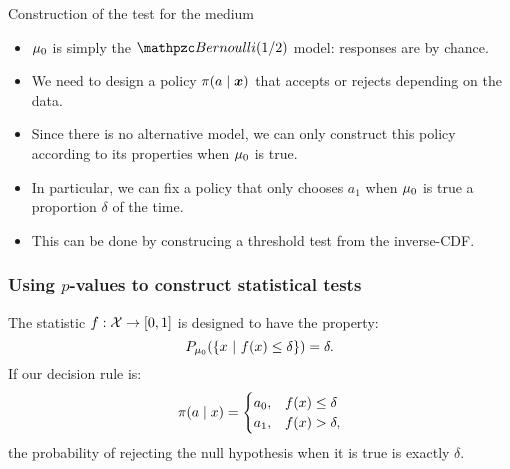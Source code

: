 {\begin{frame}
  \begin{example}{Construction of the test for the medium}
    \begin{itemize}
    \item<2-> $\mu_0$ is simply the $\Bernoulli(1/2)$ model: responses are by chance.
    \item<3-> We need to design a policy $\pol(a \mid \bx)$ that accepts or rejects depending on the data.
    \item<4-> Since there is no alternative model, we can only construct this policy according to its properties when $\mu_0$ is true.
    \item<5-> In particular, we can fix a policy that only chooses $a_1$ when $\mu_0$ is true a proportion $\delta$ of the time.
    \item<6-> This can be done by construcing a threshold test from the inverse-CDF.
    \end{itemize}
  \end{example}
\end{frame}
\begin{frame}
  \frametitle{Using $p$-values to construct statistical tests}
  \begin{definition}
    The statistic $f : {\mathcal{X}} \to [0,1]$ is  designed to have the property:
    \[
    P_{\mu_0}(\left\{x ~\middle|~ f(x) \leq \delta\right\}) = \delta.
    \]
    If our decision rule is:
    \[
    \pi(a \mid x) =
    \begin{cases}
      a_0, & f(x) \leq \delta\\
      a_1, & f(x) > \delta,
    \end{cases}
    \]
    the probability of rejecting the null hypothesis when it is true is exactly $\delta$.
  \end{definition}

\end{frame}}
